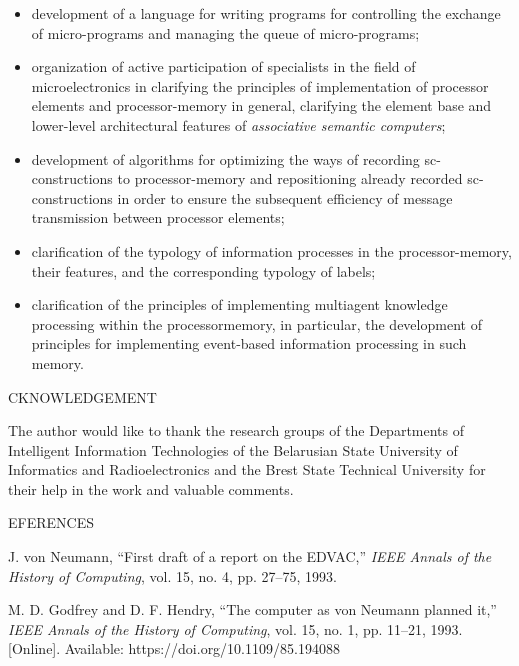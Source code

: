 \documentclass{article}
\begin{document}
{\begin{multicols}{2}
\begin{itemize}
    \item development of a language for writing programs
for controlling the exchange of micro-programs and
managing the queue of micro-programs;

    \item organization of active participation of specialists
in the field of microelectronics in clarifying the
principles of implementation of processor elements
and processor-memory in general, clarifying the
element base and lower-level architectural features
of \textit{associative semantic computers};
    \item development of algorithms for optimizing the ways
of recording sc-constructions to processor-memory
and repositioning already recorded sc-constructions
in order to ensure the subsequent efficiency of
message transmission between processor elements;
    \item clarification of the typology of information processes
in the processor-memory, their features, and the
corresponding typology of labels;
    \item clarification of the principles of implementing multiagent knowledge processing within the processormemory, in particular, the development of principles
for implementing event-based information processing
in such memory.
\end{itemize}

\begin{center}
    {\selectfont {\large A}CKNOWLEDGEMENT}
\end{center}

The author would like to thank the research groups of
the Departments of Intelligent Information Technologies
of the Belarusian State University of Informatics and
Radioelectronics and the Brest State Technical University
for their help in the work and valuable comments.

\begin{center}
    {\selectfont {\large R}EFERENCES}
\end{center}

{\footnotesize
\begin{enumerate}[label={[\arabic*]}]
    \item J. von Neumann, “First draft of a report on the EDVAC,” \textit{IEEE
Annals of the History of Computing}, vol. 15, no. 4, pp. 27–75,
1993.
    \item M. D. Godfrey and D. F. Hendry, “The computer as
von Neumann planned it,” \textit{IEEE Annals of the History of
Computing}, vol. 15, no. 1, pp. 11–21, 1993. [Online]. Available:
https://doi.org/10.1109/85.194088


\end{enumerate}}
\end{multicols}}
\end{document}
